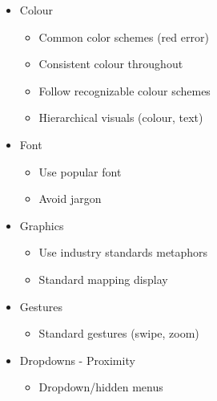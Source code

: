 \documentclass[a4 paper, 12pt]{article}
\begin{document}
    \begin{multicols}{2}
        \begin{itemize}
            \item Colour
                \begin{itemize}
                    \item Common color schemes (red error)
                    \item Consistent colour throughout
                    \item Follow recognizable colour schemes
                    \item Hierarchical visuals (colour, text)
                \end{itemize}
            \item Font
                \begin{itemize}
                    \item Use popular font
                    \item Avoid jargon
                \end{itemize}
            \item Graphics
                \begin{itemize}
                    \item Use industry standards metaphors                            
                    \item Standard mapping display 
                \end{itemize}    
            \item Gestures
                \begin{itemize}
                    \item Standard gestures (swipe, zoom)
                \end{itemize}
            
            \item Dropdowns - Proximity
                \begin{itemize}
                    \item Dropdown/hidden menus
                \end{itemize}
             

\end{itemize}
\end{multicols}
\end{document}
